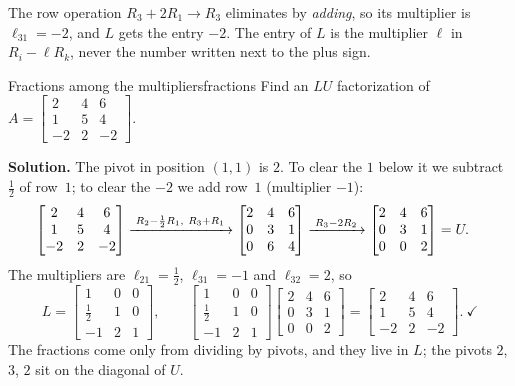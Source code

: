 \documentclass[11pt]{article}
\begin{document}
\begin{warn}
The row operation $R_3+2R_1\to R_3$ eliminates by \emph{adding}, so its multiplier is $\ell_{31}=-2$, and $L$ gets the entry $-2$. The entry of $L$ is the multiplier $\ell$ in $R_i-\ell R_k$, never the number written next to the plus sign.
\end{warn}

\begin{exmp}{Fractions among the multipliers}{fractions}
Find an $LU$ factorization of $A=\begin{bmatrix}2&4&6\\1&5&4\\-2&2&-2\end{bmatrix}$.

\textbf{Solution.} The pivot in position $(1,1)$ is $2$. To clear the $1$ below it we subtract $\tfrac12$ of row~$1$; to clear the $-2$ we add row~$1$ (multiplier $-1$):
\begin{align*}
\begin{bmatrix}2&4&6\\1&5&4\\-2&2&-2\end{bmatrix}
&\xrightarrow{\;R_2-\frac12R_1,\ R_3+R_1\;}
\begin{bmatrix}2&4&6\\0&3&1\\0&6&4\end{bmatrix}
\xrightarrow{\;R_3-2R_2\;}
\begin{bmatrix}2&4&6\\0&3&1\\0&0&2\end{bmatrix}=U .
\end{align*}
The multipliers are $\ell_{21}=\tfrac12$, $\ell_{31}=-1$ and $\ell_{32}=2$, so
\[
L=\begin{bmatrix}1&0&0\\\tfrac12&1&0\\-1&2&1\end{bmatrix},\qquad
\begin{bmatrix}1&0&0\\\tfrac12&1&0\\-1&2&1\end{bmatrix}\begin{bmatrix}2&4&6\\0&3&1\\0&0&2\end{bmatrix}=\begin{bmatrix}2&4&6\\1&5&4\\-2&2&-2\end{bmatrix}.\ \checkmark
\]
The fractions come only from dividing by pivots, and they live in $L$; the pivots $2$, $3$, $2$ sit on the diagonal of $U$.
\end{exmp}
\end{document}
